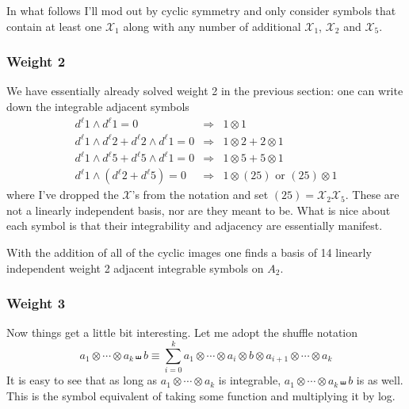\documentclass[12pt]{article}
\def\x{\mathcal{X}}
\def\dl{d^{\ell}}
\begin{document}
In what follows I'll mod out by cyclic symmetry and only consider symbols that contain at least one $\x_1$ along with any number of additional $\x_1$, $\x_2$ and $\x_5$.


\subsubsection*{Weight 2}

We have essentially already solved weight 2 in the previous section: one can write down the integrable adjacent symbols
\begin{eqnarray}
	\dl1\wedge \dl1 =0 &\Rightarrow &1\otimes1\\
	\dl1 \wedge \dl2+\dl2 \wedge \dl1 = 0 &\Rightarrow &1\otimes2 + 2\otimes1\\
	\dl1 \wedge \dl5+\dl5 \wedge \dl1 = 0 &\Rightarrow &1\otimes5 + 5\otimes1\\
	\dl1 \wedge (\dl2 + \dl5)=0 &\Rightarrow &1\otimes(25) \text{ or } (25)\otimes1
\end{eqnarray}
where I've dropped the $\x$'s from the notation and set $(25)=\x_2\x_5$. These are not a linearly independent basis, nor are they meant to be. What is nice about each symbol is that their integrability and adjacency are essentially manifest.

With the addition of all of the cyclic images one finds a basis of 14 linearly independent weight 2 adjacent integrable symbols on $A_2$.
\subsubsection*{Weight 3}

Now things get a little bit interesting. Let me adopt the shuffle notation
\begin{equation}
	a_1\otimes\cdots\otimes a_k \shuffle b \equiv \sum_{i=0}^k a_1\otimes \cdots\otimes a_i \otimes b\otimes a_{i+1} \otimes \cdots \otimes a_k
\end{equation}
It is easy to see that as long as $a_1\otimes\cdots\otimes a_k$ is integrable, $a_1\otimes\cdots\otimes a_k \shuffle b$ is as well. This is the symbol equivalent of taking some function and multiplying it by log. 
\end{document}

